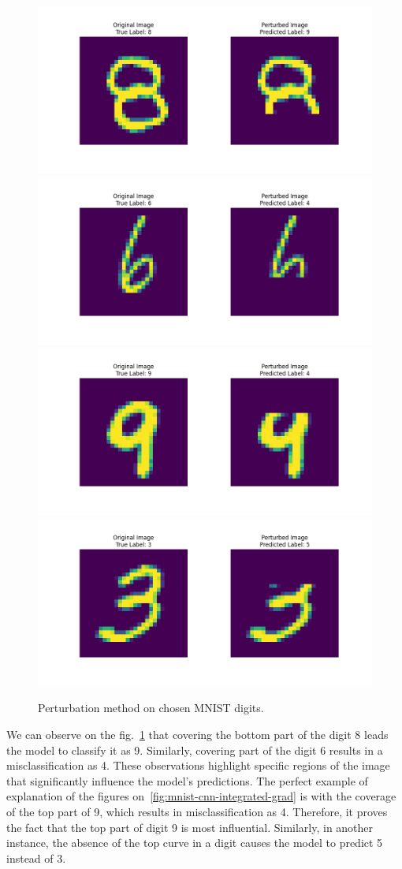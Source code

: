 \documentclass[journal, a4paper]{IEEEtran}
\begin{document}
\begin{figure}[ht]\centering
    \includegraphics[width=.6\linewidth]{img/counterfacts/MNIST/cover_bottom/img_1}
    \includegraphics[width=.6\linewidth]{img/counterfacts/MNIST/cover_bottom/img_3}
    \includegraphics[width=.6\linewidth]{img/counterfacts/MNIST/cover_top/img_10}
    \includegraphics[width=.6\linewidth]{img/counterfacts/MNIST/cover_top/img_3}
    \caption{Perturbation method on chosen MNIST digits.}\label{fig:mnist-cnn-counterfacts}
\end{figure}

We can observe on the fig.~\ref{fig:mnist-cnn-counterfacts} that covering the bottom part of the digit 8 leads the model to classify it as 9.
Similarly, covering part of the digit 6 results in a misclassification as 4.
These observations highlight specific regions of the image that significantly influence the model's predictions.
The perfect example of explanation of the figures on~\ref{fig:mnist-cnn-integrated-grad} is with the coverage of the top part of 9, which results in misclassification as 4.
Therefore, it proves the fact that the top part of digit 9 is most influential.
Similarly, in another instance, the absence of the top curve in a digit causes the model to predict 5 instead of 3.
\end{document}
